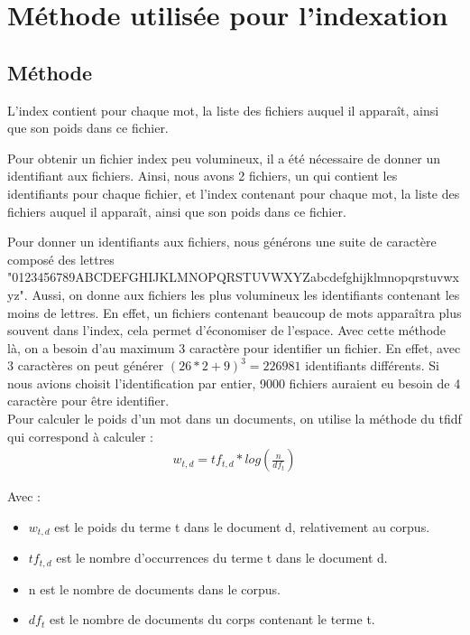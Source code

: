 \section{Méthode utilisée pour l'indexation}

\subsection{Méthode}
L'index contient pour chaque mot, la liste des fichiers auquel il apparaît, ainsi que son poids dans ce fichier.

Pour obtenir un fichier index peu volumineux, il a été nécessaire de donner un identifiant aux fichiers. Ainsi, nous avons 2 fichiers, un qui contient les identifiants pour chaque fichier, et l'index contenant pour chaque mot, la liste des fichiers auquel il apparaît, ainsi que son poids dans ce fichier.

Pour donner un identifiants aux fichiers, nous générons une suite de caractère composé des lettres "0123456789ABCDEFGHIJKLMNOPQRSTUVWXYZabcdefghijklmnopqrstuvwxyz". Aussi, on donne aux fichiers les plus volumineux les identifiants contenant les moins de lettres. En effet, un fichiers contenant beaucoup de mots apparaîtra plus souvent dans l'index, cela permet d'économiser de l'espace. Avec cette méthode là, on a besoin d'au maximum 3 caractère pour identifier un fichier. En effet, avec 3 caractères on peut générer $(26*2+9)^3=226981$ identifiants différents. Si nous avions choisit l'identification par entier, 9000 fichiers auraient eu besoin de 4 caractère pour être identifier.\\

Pour calculer le poids d'un mot dans un documents, on utilise la méthode du tfidf qui correspond à calculer :
\begin{align*}
w_{t,d} = tf_{t,d} * log(\frac{n}{df_t})
\end{align*}

Avec :
\begin{itemize}
	\item $w_{t,d}$ est le poids du terme t dans le document d, relativement au corpus.
	\item $tf_{t,d}$ est le nombre d'occurrences du terme t dans le document d.
	\item n est le nombre de documents dans le corpus. 
	\item $df_t$ est le nombre de documents du corps contenant le terme t.
\end{itemize}

